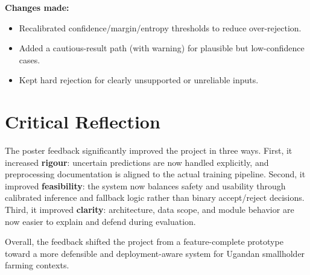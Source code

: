 \documentclass[10pt,a4paper]{article}
\begin{document}
\textbf{Changes made:}
\begin{itemize}[noitemsep]
  \item Recalibrated confidence/margin/entropy thresholds to reduce over-rejection.
  \item Added a cautious-result path (with warning) for plausible but low-confidence cases.
  \item Kept hard rejection for clearly unsupported or unreliable inputs.
\end{itemize}

\section*{Critical Reflection}
The poster feedback significantly improved the project in three ways. First, it increased \textbf{rigour}: uncertain predictions are now handled explicitly, and preprocessing documentation is aligned to the actual training pipeline. Second, it improved \textbf{feasibility}: the system now balances safety and usability through calibrated inference and fallback logic rather than binary accept/reject decisions. Third, it improved \textbf{clarity}: architecture, data scope, and module behavior are now easier to explain and defend during evaluation.

Overall, the feedback shifted the project from a feature-complete prototype toward a more defensible and deployment-aware system for Ugandan smallholder farming contexts.
\end{document}
